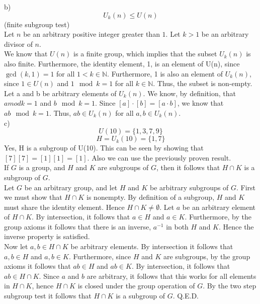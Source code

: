 \documentclass{article}
\begin{document}
b) $$U_k(n)\leq U(n)$$ (finite subgroup test)\\
Let $n$ be an arbitrary positive integer greater than $1$.
Let $k>1$ be an arbitrary divisor of $n.$\\
We know that $U(n)$ is a finite group, which implies that the subset $U_k(n)$ is also finite. 
Furthermore, the identity element, 1, is an element of U(n), since $\gcd(k, 1)=1$ for all $1<k \in \mathbb{N}$. Furthermore, 1 is also an element of $U_k(n)$, since $1 \in U(n)$ and $1 \mod k=1$ for all $k \in \mathbb{N}$. Thus, the subset is non-empty.\\

Let a and b be arbitrary elements of $U_k(n)$. We know, by definition, that $a mod k = 1$ and $b \mod k = 1$. Since $[a] \cdot [b] = [a \cdot b]$, we know that $ab \mod k = 1$. Thus, $ab \in U_k(n)$ for all $a,b\in U_k(n)$. \\

c)
$$U(10)=\{1, 3, 7, 9\}$$
$$H = U_k(10)=\{1, 7\}$$
Yes, H is a subgroup of U(10). This can be seen by showing that $[7][7] = [1][1] = [1]$. Also we can use the previously proven result.\\

 If $G$ is a group, and $H$ and $K$ are subgroups of $G$, then it follows that $H\cap K$ is a subgroup of $G$.\\

 Let $G$ be an arbitrary group, and let $H$ and $K$ be arbitrary subgroups of $G$. First we must show that $H\cap K$ is nonempty. By definition of a subgroup, $H$ and $K$ must share the identity element. Hence $H\cap K\ne \emptyset$. Let $a$ be an arbitrary element of $H\cap K$. By intersection, it follows that $a\in H$ and $a\in K$. Furthermore, by the group axioms it follows that there is an inverse, $a^{-1}$ in both $H$ and $K$. Hence the inverse property is satisfied.\\
Now let $a,b\in H\cap K$ be arbitrary elements. By intersection it follows that $a,b\in H$ and $a,b\in K$. Furthermore, since $H$ and $K$ are subgroups, by the group axioms it follows that $ab \in H$ and $ab\in K$. By intersection, it follows that $ab\in H\cap K$. Since $a$ and $b$ are arbitrary, it follows that this works for all elements in $H\cap K$, hence $H\cap K$ is closed under the group operation of $G$. By the two step subgroup test it follows that $H\cap K$ is a subgroup of $G$. Q.E.D.\\
\newpage
\end{document}
